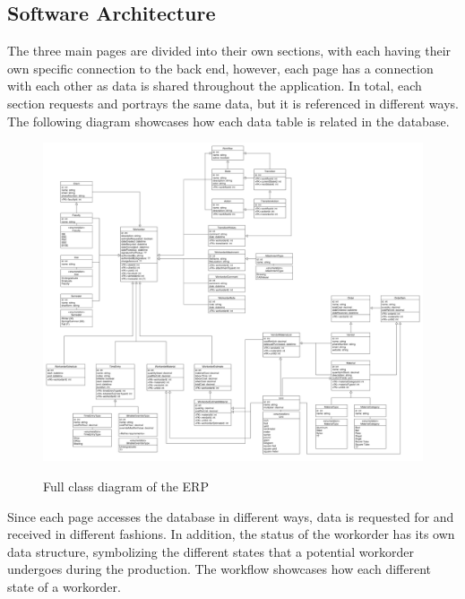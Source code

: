 {{{{{{{{\subsection{Software Architecture}
The three main pages are divided into their own sections, with each having their own specific connection to the back end, however, each page has a connection with each other as data is shared throughout the application. In total, each section requests and portrays the same data, but it is referenced in different ways. The following diagram showcases how each data table is related in the database.   
\begin{figure}[H]
	\centering
	\includegraphics[width=7in]{class.png}\\
	\caption{Full class diagram of the ERP}
	\label{fig:tobias}
\end{figure}

Since each page accesses the database in different ways, data is requested for and received in different fashions. In addition, the status of the workorder has its own data structure, symbolizing the different states that a potential workorder undergoes during the production. The workflow showcases how each different state of a workorder.
\newpage 
}}}}}}}}
